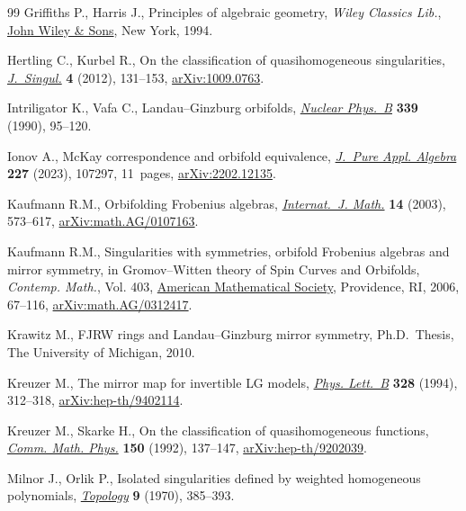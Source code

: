 \documentclass[10pt,a4paper]{amsart}
\numberwithin{equation}{section}
\begin{document}
\begin{thebibliography}{99}
Griffiths P., Harris J., Principles of algebraic geometry, \textit{Wiley Classics Lib.},
 \href{https://doi.org/10.1002/9781118032527}{John Wiley \& Sons}, New York, 1994.

Hertling C., Kurbel R., On the classification of quasihomogeneous
 singularities, \href{https://doi.org/10.5427/jsing.2012.4h}{\textit{J.~Singul.}} \textbf{4} (2012), 131--153,
 \href{https://arxiv.org/abs/1009.0763}{arXiv:1009.0763}.

Intriligator K., Vafa C., Landau--{G}inzburg orbifolds, \href{https://doi.org/10.1016/0550-3213(90)90535-L}{\textit{Nuclear
 Phys.~B}} \textbf{339} (1990), 95--120.

Ionov A., Mc{K}ay correspondence and orbifold equivalence, \href{https://doi.org/10.1016/j.jpaa.2022.107297}{\textit{J.~Pure
 Appl. Algebra}} \textbf{227} (2023), 107297, 11~pages, \href{https://arxiv.org/abs/2202.12135}{arXiv:2202.12135}.

Kaufmann R.M., Orbifolding {F}robenius algebras, \href{https://doi.org/10.1142/S0129167X03001831}{\textit{Internat.~J. Math.}}
 \textbf{14} (2003), 573--617, \href{https://arxiv.org/abs/math.AG/0107163}{arXiv:math.AG/0107163}.

Kaufmann R.M., Singularities with symmetries, orbifold {F}robenius algebras and
 mirror symmetry, in Gro\-mov--{W}itten theory of {S}pin {C}urves and
 {O}rbifolds, \textit{Contemp. Math.}, Vol. 403, \href{https://doi.org/10.1090/conm/403/07596}{American Mathematical
 Society}, Providence, RI, 2006, 67--116, \href{https://arxiv.org/abs/math.AG/0312417}{arXiv:math.AG/0312417}.

Krawitz M., F{JRW} rings and {L}andau--{G}inzburg mirror symmetry, Ph.D.~Thesis, {T}he {U}niversity of {M}ichigan, 2010.

Kreuzer M., The mirror map for invertible {LG} models, \href{https://doi.org/10.1016/0370-2693(94)91485-0}{\textit{Phys. Lett.~B}}
 \textbf{328} (1994), 312--318, \href{https://arxiv.org/abs/hep-th/9402114}{arXiv:hep-th/9402114}.

Kreuzer M., Skarke H., On the classification of quasihomogeneous functions,
 \href{https://doi.org/10.1007/BF02096569}{\textit{Comm. Math. Phys.}} \textbf{150} (1992), 137--147,
 \href{https://arxiv.org/abs/hep-th/9202039}{arXiv:hep-th/9202039}.

Milnor J., Orlik P., Isolated singularities defined by weighted homogeneous
 polynomials, \href{https://doi.org/10.1016/0040-9383(70)90061-3}{\textit{Topology}} \textbf{9} (1970), 385--393.


\end{thebibliography}
\end{document}

